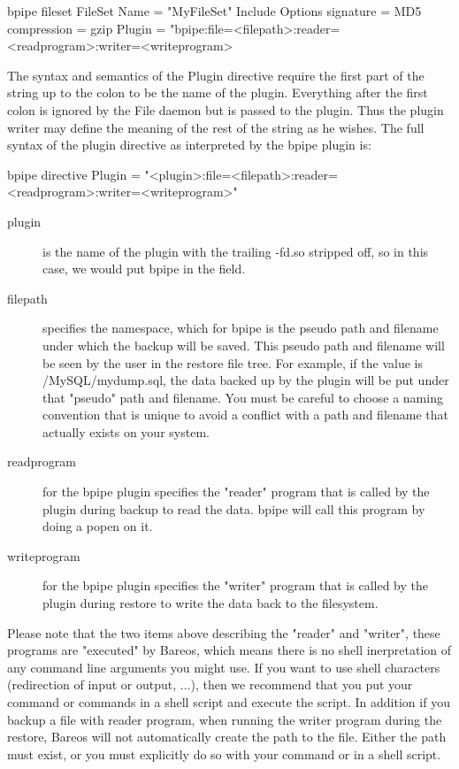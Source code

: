 \begin{bconfig}{bpipe fileset}
FileSet {
  Name = "MyFileSet"
  Include {
    Options {
      signature = MD5
      compression = gzip
    }
    Plugin = "bpipe:file=<filepath>:reader=<readprogram>:writer=<writeprogram>
  }
}
\end{bconfig}

The syntax and semantics of the Plugin directive require the first part of the string up to the colon to be the name of the plugin.
Everything after the first colon is ignored by the File daemon but is passed to the plugin. Thus the plugin writer may define the 
meaning of the rest of the string as he wishes. The full syntax of the plugin directive as interpreted by the bpipe plugin is:

\begin{bconfig}{bpipe directive}
Plugin = "<plugin>:file=<filepath>:reader=<readprogram>:writer=<writeprogram>"
\end{bconfig}

\begin{description}
\item[plugin] is the name of the plugin with the trailing -fd.so stripped off, so in this case, we would put bpipe in the field.

\item[filepath] specifies the namespace, which for bpipe is the pseudo path and filename under which the backup will be saved. This
pseudo path and filename will be seen by the user in the restore file tree. For example, if the value is /MySQL/mydump.sql, the data
backed up by the plugin will be put under that "pseudo" path and filename. You must be careful to choose a naming convention that is unique
to avoid a conflict with a path and filename that actually exists on your system.

\item[readprogram] for the bpipe plugin specifies the "reader" program that is called by the plugin during backup to read the data. bpipe
will call this program by doing a popen on it.

\item[writeprogram] for the bpipe plugin specifies the "writer" program that is called by the plugin during restore to write the data back 
to the filesystem.
\end{description}

Please note that the two items above describing the "reader" and "writer", these programs are "executed" by Bareos, which means 
there is no shell inerpretation of any command line arguments you might use. If you want to use shell characters (redirection of input 
or output, ...), then we recommend that you put your command or commands in a shell script and execute the script. In addition if you
backup a file with reader program, when running the writer program during the restore, Bareos will not automatically create the path
to the file. Either the path must exist, or you must explicitly do so with your command or in a shell script.

